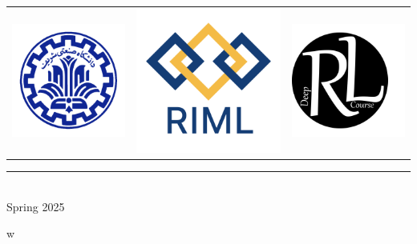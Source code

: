 \documentclass[12pt]{article}
\begin{document}
\begin{center}
{\vspace*{\fill}
\begin{center}
\begin{tabular}{ccc}
    \includegraphics[width=0.14\linewidth]{figs/sharif-logo.png} & \includegraphics[width=0.14\linewidth]{figs/riml-logo.png} & \includegraphics[width=0.14\linewidth]{figs/dlr-logo.png} \\
\end{tabular}
\end{center}

\vspace*{-.25cm}

{\color{YellowOrange} {
\rule{10cm}{0.5pt} \\
\vspace{2pt}
\large Spring 2025}
}}w
\vspace*{-1cm}

\end{center}



\newpage
{}
\thispagestyle{plain}
{\selectfont {\color{BrickRed} \textbf{\tableofcontents} }}
\end{document}

